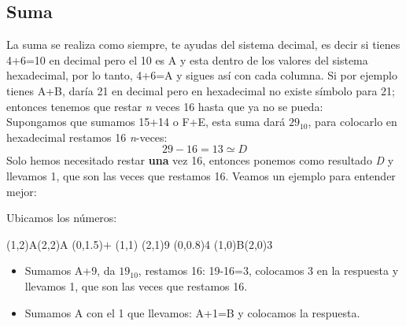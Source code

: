 \documentclass[
	12pt, %
	fleqn, %
	a4paper, %
	oneside, %
]{LegrandOrangeBook}
\begin{document}
\subsection{Suma}
La suma se realiza como siempre, te ayudas del sistema decimal, es decir si tienes 4+6=10 en decimal pero el 10 es A y esta dentro de los valores del sistema hexadecimal, por lo tanto, 4+6=A y sigues así con cada columna. Si por ejemplo tienes  A+B, daría 21 en decimal pero en hexadecimal no existe símbolo para 21; entonces tenemos que restar \textit{n} veces 16 hasta que ya no se pueda:\\
Supongamos que sumamos 15+14 o F+E, esta suma dará $29_{10}$, para colocarlo en hexadecimal restamos 16 \textit{n}-veces:
\begin{displaymath}
29-16=13\simeq D
\end{displaymath}
Solo hemos necesitado restar \textbf{una} vez 16, entonces ponemos como resultado \textit{D} y llevamos 1, que son las veces que restamos 16. Veamos un ejemplo para entender mejor:
\begin{example}
Ubicamos los números:
\begin{center}
\par\vspace{2\oplineheight}
\oplput(1,2){A}\oplput(2,2){A}
\oplput(0,1.5){$+$}
\oplput(1,1){ }\oplput(2,1){9}
\ophline(0,0.8){4}
\oplput(1,0){B}\oplput(2,0){3}
\end{center}
\begin{itemize}
\item Sumamos A+9, da $19_{10}$, restamos 16: 19-16=3, colocamos 3 en la respuesta y llevamos 1, que son las veces que restamos 16.
\item Sumamos A con el 1 que llevamos: A+1=B y colocamos la respuesta.
\end{itemize}
\end{example}
\end{document}
